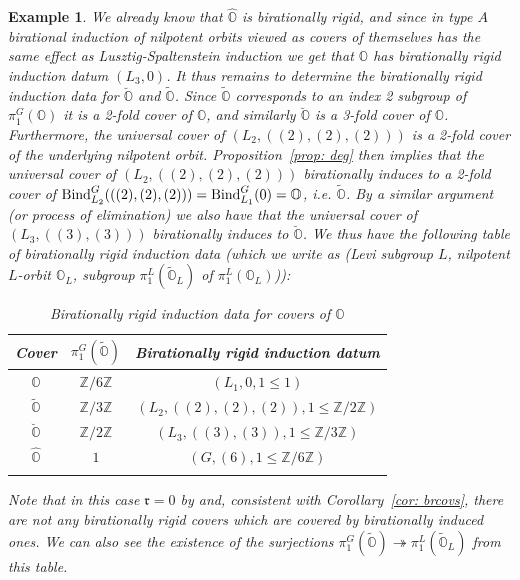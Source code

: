 \documentclass[11pt]{amsart}
\renewcommand{\O}{{\mathbb O}}
\newcommand{\bZ}{{\mathbb Z}}
\renewcommand{\r}{{\mathfrak r}}
\newcommand{\BInd}{{{\mbox{\rm Bind}}}}
\newcommand{\covO}{\widetilde{\O}}
\newcommand{\hatO}{\widehat{\O}}
\newcommand{\breveO}{\breve{\O}}
\newtheorem{exa}{Example}
\numberwithin{equation}{section}
\begin{document}
\begin{exa}
	We already know that $\hatO$ is birationally rigid, and since in type $A$ birational induction of nilpotent orbits viewed as covers of themselves has the same effect as Lusztig-Spaltenstein induction we get that $\O$ has birationally rigid induction datum $(L_3,0)$. It thus remains to determine the birationally rigid induction data for $\breveO$ and $\covO$. Since $\covO$ corresponds to an index 2 subgroup of $\pi_1^G(\O)$ it is a 2-fold cover of $\O$, and similarly $\breveO$ is a 3-fold cover of $\O$. Furthermore, the universal cover of $(L_2,((2),(2),(2)))$ is a 2-fold cover of the underlying nilpotent orbit. Proposition~\ref{prop: deg} then implies that the universal cover of $(L_2,((2),(2),(2)))$ birationally induces to a 2-fold cover of $\BInd_{L_2}^G(((2),(2),(2)))=\BInd_{L_1}^G(0)=\O$, i.e. $\covO$. By a similar argument (or process of elimination) we also have that the universal cover of $(L_3,((3),(3)))$ birationally induces to $\breveO$. We thus have the following table of birationally rigid induction data (which we write as (Levi subgroup $L$, nilpotent $L$-orbit $\O_L$, subgroup $\pi_1^L(\covO_L)$ of $\pi_1^L(\O_L)$)):
				\renewcommand{\arraystretch}{2}
	\begin{center}
		\begin{longtable}{|c|c|c|}
			\hline
			Cover & $\pi_1^G(\covO)$ &  Birationally rigid induction datum\\
			\hline
			$\O$ & $\bZ/6\bZ$ & $(L_1, 0, 1\leq 1)$\\
			\hline
			$\covO$ & $\bZ/3\bZ$ & $(L_2, ((2),(2),(2)), 1\leq \bZ/2\bZ)$  \\
			\hline
			$\breveO$ & $\bZ/2\bZ$ & $(L_3, ((3),(3)), 1\leq \bZ/3\bZ)$  \\
			\hline
			$\hatO$ & $1$ &  $(G, (6), 1\leq \bZ/6\bZ)$  \\
			\hline
			\caption{Birationally rigid induction data for covers of $\O$}\label{ta: AInd}
		\end{longtable}
	\end{center}
	\renewcommand{\arraystretch}{}
	Note that in this case $\r=0$ by \cite[Theorem 6.1.3]{CM} and, consistent with Corollary~\ref{cor: brcovs}, there are not any birationally rigid covers which are covered by birationally induced ones. We can also see the existence of the surjections $\pi_1^G(\covO)\twoheadrightarrow \pi_1^L(\covO_L)$ from this table.
	\end{exa}
	
\end{document}
